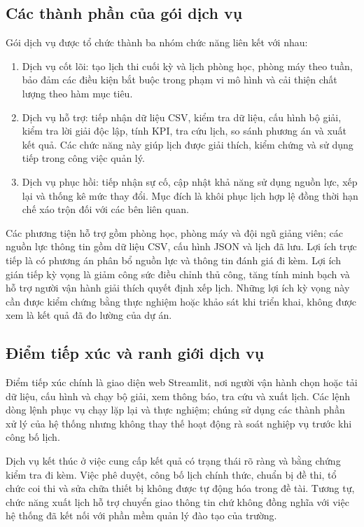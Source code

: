 \subsection{Các thành phần của gói dịch vụ}

Gói dịch vụ được tổ chức thành ba nhóm chức năng liên kết với nhau:
\begin{enumerate}
    \item Dịch vụ cốt lõi: tạo lịch thi cuối kỳ và lịch phòng học, phòng máy theo tuần, bảo đảm các điều kiện bắt buộc trong phạm vi mô hình và cải thiện chất lượng theo hàm mục tiêu.
    \item Dịch vụ hỗ trợ: tiếp nhận dữ liệu CSV, kiểm tra dữ liệu, cấu hình bộ giải, kiểm tra lời giải độc lập, tính KPI, tra cứu lịch, so sánh phương án và xuất kết quả. Các chức năng này giúp lịch được giải thích, kiểm chứng và sử dụng tiếp trong công việc quản lý.
    \item Dịch vụ phục hồi: tiếp nhận sự cố, cập nhật khả năng sử dụng nguồn lực, xếp lại và thống kê mức thay đổi. Mục đích là khôi phục lịch hợp lệ đồng thời hạn chế xáo trộn đối với các bên liên quan.
\end{enumerate}

Các phương tiện hỗ trợ gồm phòng học, phòng máy và đội ngũ giảng viên; các nguồn lực thông tin gồm dữ liệu CSV, cấu hình JSON và lịch đã lưu. Lợi ích trực tiếp là có phương án phân bổ nguồn lực và thông tin đánh giá đi kèm. Lợi ích gián tiếp kỳ vọng là giảm công sức điều chỉnh thủ công, tăng tính minh bạch và hỗ trợ người vận hành giải thích quyết định xếp lịch. Những lợi ích kỳ vọng này cần được kiểm chứng bằng thực nghiệm hoặc khảo sát khi triển khai, không được xem là kết quả đã đo lường của dự án.

\subsection{Điểm tiếp xúc và ranh giới dịch vụ}

Điểm tiếp xúc chính là giao diện web Streamlit, nơi người vận hành chọn hoặc tải dữ liệu, cấu hình và chạy bộ giải, xem thông báo, tra cứu và xuất lịch. Các lệnh dòng lệnh phục vụ chạy lặp lại và thực nghiệm; chúng sử dụng các thành phần xử lý của hệ thống nhưng không thay thế hoạt động rà soát nghiệp vụ trước khi công bố lịch.

Dịch vụ kết thúc ở việc cung cấp kết quả có trạng thái rõ ràng và bằng chứng kiểm tra đi kèm. Việc phê duyệt, công bố lịch chính thức, chuẩn bị đề thi, tổ chức coi thi và sửa chữa thiết bị không được tự động hóa trong đề tài. Tương tự, chức năng xuất lịch hỗ trợ chuyển giao thông tin chứ không đồng nghĩa với việc hệ thống đã kết nối với phần mềm quản lý đào tạo của trường.

